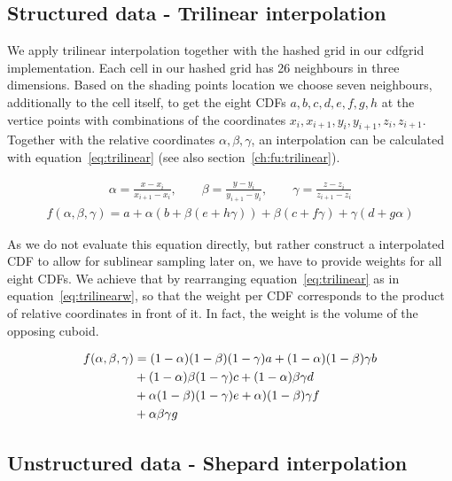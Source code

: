 \subsection{Structured data - Trilinear interpolation}
\label{ch:trilinear}

We apply trilinear interpolation together with the hashed grid in our cdfgrid implementation. Each cell in our hashed grid has 26 neighbours in three dimensions. Based on the shading points location we choose seven neighbours, additionally to the cell itself, to get the eight CDFs $a,b,c,d,e,f,g,h$ at the vertice points with combinations of the coordinates $x_i, x_{i+1}, y_i, y_{i+1}, z_i, z_{i+1}$. Together with the relative coordinates $\alpha, \beta, \gamma$, an interpolation can be calculated with equation~\ref{eq:trilinear} (see also section~\ref{ch:fu:trilinear}).

\begin{align}
    \alpha = \frac{x-x_i}{x_{i+1}-x_i}, \qquad \beta = \frac{y-y_i}{y_{i+1}-y_i}, \qquad \gamma = \frac{z-z_i}{z_{i+1}-z_i}
\end{align}
\begin{align}\label{eq:trilinear}
    f(\alpha, \beta, \gamma) = a + \alpha\left(b + \beta(e + h\gamma)\right) + \beta(c + f\gamma) + \gamma(d + g\alpha)
\end{align}

As we do not evaluate this equation directly, but rather construct a interpolated CDF to allow for sublinear sampling later on, we have to provide weights for all eight CDFs. We achieve that by rearranging equation~\ref{eq:trilinear} as in equation~\ref{eq:trilinearw}, so that the weight per CDF corresponds to the product of relative coordinates in front of it. In fact, the weight is the volume of the opposing cuboid.


\begin{align}\label{eq:trilinearw}
    f(\alpha, \beta, \gamma) &= (1-\alpha)(1-\beta)(1-\gamma)a + (1-\alpha)(1-\beta)\gamma b  \notag \\
    &+ (1-\alpha)\beta(1-\gamma)c  + (1-\alpha)\beta\gamma d \\
    &+ \alpha(1-\beta)(1-\gamma)e + \alpha)(1-\beta)\gamma f \notag \\
    &+ \alpha\beta\gamma g  \notag
\end{align}


\subsection{Unstructured data - Shepard interpolation}
\label{ch:unstructured}

